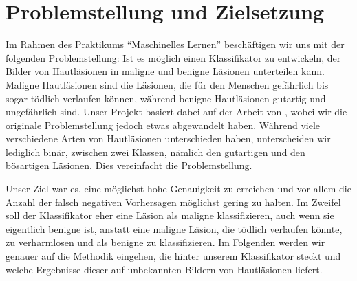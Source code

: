 \section{Problemstellung und Zielsetzung}

Im Rahmen des Praktikums ``Maschinelles Lernen'' beschäftigen wir uns mit der folgenden Problemstellung: Ist es möglich einen Klassifikator zu entwickeln, der Bilder von Hautläsionen in maligne und benigne Läsionen unterteilen kann. Maligne Hautläsionen sind die Läsionen, die für den Menschen gefährlich bis sogar tödlich verlaufen können, während benigne Hautläsionen gutartig und ungefährlich sind. Unser Projekt basiert dabei auf der Arbeit von \citet{esteva2017dermatologist}, wobei wir die originale Problemstellung jedoch etwas abgewandelt haben. Während \citet{esteva2017dermatologist} viele verschiedene Arten von Hautläsionen unterschieden haben, unterscheiden wir lediglich binär, zwischen zwei Klassen, nämlich den gutartigen und den bösartigen Läsionen. Dies vereinfacht die Problemstellung.

Unser Ziel war es, eine möglichst hohe Genauigkeit zu erreichen und vor allem die Anzahl der falsch negativen Vorhersagen möglichst gering zu halten. Im Zweifel soll der Klassifikator eher eine Läsion als maligne klassifizieren, auch wenn sie eigentlich benigne ist, anstatt eine maligne Läsion, die tödlich verlaufen könnte, zu verharmlosen und als benigne zu klassifizieren. Im Folgenden werden wir genauer auf die Methodik eingehen, die hinter unserem Klassifikator steckt und welche Ergebnisse dieser auf unbekannten Bildern von Hautläsionen liefert. 